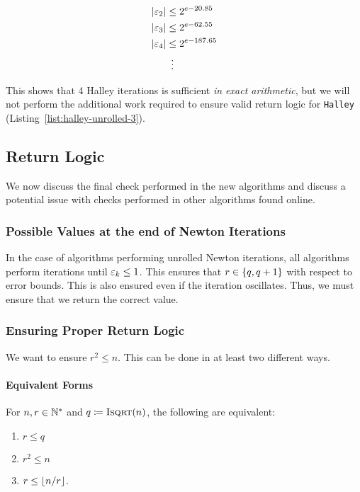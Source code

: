 \begin{align}
    \left| \varepsilon_{2} \right| &\le 2^{e-20.85} \nonumber\\
    \left| \varepsilon_{3} \right| &\le 2^{e-62.55} \nonumber\\
    \left| \varepsilon_{4} \right| &\le 2^{e-187.65} \nonumber\\
        &\ \vdots
\end{align}

\noindent
This shows that 4 Halley iterations is sufficient
\emph{in exact arithmetic},
but we will not perform the additional work required
to ensure valid return logic
for \texttt{Halley} (Listing~\ref{list:halley-unrolled-3}).


\subsection{Return Logic}
\label{app:return_logic}

We now discuss the final check performed in the new algorithms
and discuss a potential issue with checks performed
in other algorithms found online.

\subsubsection{Possible Values at the end of Newton Iterations}
In the case of algorithms performing unrolled Newton iterations,
all algorithms perform iterations until $\varepsilon_{k}\le 1$.
This ensures that $r\in\left\{ q,q+1 \right\}$ with respect
to error bounds.
This is also ensured even if the iteration oscillates.
Thus, we must ensure that we return the correct value.

\subsubsection{Ensuring Proper Return Logic}
We want to ensure $r^{2}\le n$.
This can be done in at least two different ways.

\paragraph{Equivalent Forms}
For $n, r\in \mathbb{N}^{*}$ and $q\coloneqq{} \textsc{Isqrt}( n )$,
the following are equivalent:

\begin{enumerate}
\item $r \le q$
\item $r^{2} \le n$
\item $r \le \left\lfloor n/r \right\rfloor$.
\end{enumerate}


